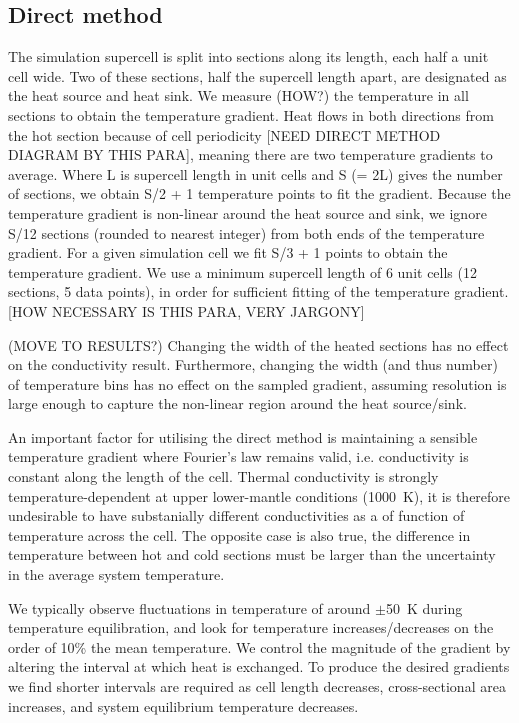 \documentclass[%
preprint,                                  %
nofootinbib,
 amsmath,amssymb,
 aps,
]{revtex4-1}
\begin{document}
\subsection{\label{sec:method.direct}Direct method}

The simulation supercell is split into sections along its length, each half a unit cell wide. Two of these sections, half the supercell length apart, are designated as the heat source and heat sink. We measure (HOW?) the temperature in all sections to obtain the temperature gradient. Heat flows in both directions from the hot section because of cell periodicity [NEED DIRECT METHOD DIAGRAM BY THIS PARA], meaning there are two temperature gradients to average. Where L is supercell length in unit cells and S (= 2L) gives the number of sections, we obtain S/2 + 1 temperature points to fit the gradient. Because the temperature gradient is non-linear around the heat source and sink, we ignore S/12 sections (rounded to nearest integer) from both ends of the temperature gradient. For a given simulation cell we fit S/3 + 1 points to obtain the temperature gradient. We use a minimum supercell length of 6 unit cells (12 sections, 5 data points), in order for sufficient fitting of the temperature gradient. [HOW NECESSARY IS THIS PARA, VERY JARGONY]

(MOVE TO RESULTS?) Changing the width of the heated sections has no effect on the conductivity result. Furthermore, changing the width (and thus number) of temperature bins has no effect on the sampled gradient, assuming resolution is large enough to capture the non-linear region around the heat source/sink.

An important factor for utilising the direct method is maintaining a sensible temperature gradient where Fourier's law remains valid, i.e. conductivity is constant along the length of the cell. Thermal conductivity is strongly temperature-dependent at upper lower-mantle conditions (1000~K), it is therefore undesirable to have substanially different conductivities as a of function of temperature across the cell. The opposite case is also true, the difference in temperature between hot and cold sections must be larger than the uncertainty in the average system temperature. 

We typically observe fluctuations in temperature of around $\pm$50~K during temperature equilibration, and look for temperature increases/decreases on the order of 10\% the mean temperature. We control the magnitude of the gradient by altering the interval at which heat is exchanged. To produce the desired gradients we find shorter intervals are required as cell length decreases, cross-sectional area increases, and system equilibrium temperature decreases. 
\end{document}
